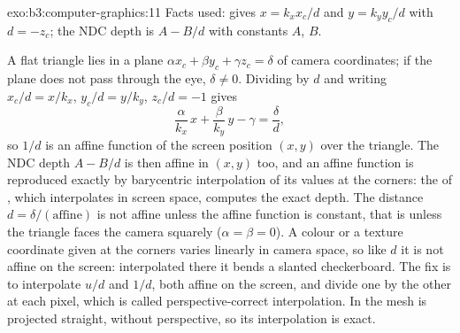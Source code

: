\begin{solution}{exo:b3:computer-graphics:11}
Facts used:  gives $x = k_x x_c/d$ and $y = k_y y_c/d$ with $d = -z_c$; the NDC depth is $A - B/d$ with constants $A$, $B$.

A flat triangle lies in a plane $\alpha x_c + \beta y_c + \gamma z_c = \delta$ of camera coordinates; if the plane does not pass through the eye, $\delta \neq 0$. Dividing by $d$ and writing $x_c/d = x/k_x$, $y_c/d = y/k_y$, $z_c/d = -1$ gives
\[
\frac{\alpha}{k_x}\,x + \frac{\beta}{k_y}\,y - \gamma = \frac{\delta}{d},
\]
so $1/d$ is an affine function of the screen position $(x, y)$ over the triangle. The NDC depth $A - B/d$ is then affine in $(x, y)$ too, and an affine function is reproduced exactly by barycentric interpolation of its values at the corners: the  of , which interpolates in screen space, computes the exact depth. The distance $d = \delta/(\text{affine})$ is not affine unless the affine function is constant, that is unless the triangle faces the camera squarely ($\alpha = \beta = 0$). A colour or a texture coordinate given at the corners varies linearly in camera space, so like $d$ it is not affine on the screen: interpolated there it bends a slanted checkerboard. The fix is to interpolate $u/d$ and $1/d$, both affine on the screen, and divide one by the other at each pixel, which is called perspective-correct interpolation. In  the mesh is projected straight, without perspective, so its interpolation is exact.
\end{solution}

